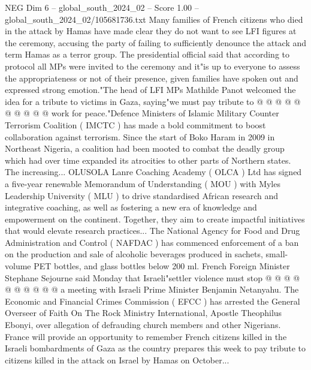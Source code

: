 \begin{textsample}{NEG Dim 6 – global\_south\_2024\_02 – Score 1.00 – global\_south\_2024\_02/105681736.txt}
Many families of French citizens who died in the attack by Hamas have made clear they do not want to see LFI figures at the ceremony, accusing the party of failing to sufficiently denounce the attack and term Hamas as a terror group.
The presidential official said that according to protocol all MPs were invited to the ceremony and it"is up to everyone to assess the appropriateness or not of their presence, given families have spoken out and expressed strong emotion."The head of LFI MPs Mathilde Panot welcomed the idea for a tribute to victims in Gaza, saying"we must pay tribute to @ @ @ @ @ @ @ @ @ @ work for peace."Defence Ministers of Islamic Military Counter Terrorism Coalition ( IMCTC ) has made a bold commitment to boost collaboration against terrorism.
Since the start of Boko Haram in 2009 in Northeast Nigeria, a coalition had been mooted to combat the deadly group which had over time expanded its atrocities to other parts of Northern states.
The increasing...
OLUSOLA Lanre Coaching Academy ( OLCA ) Ltd has signed a five-year renewable Memorandum of Understanding ( MOU ) with Myles Leadership University ( MLU ) to drive standardised African research and integrative coaching, as well as fostering a new era of knowledge and empowerment on the continent.
Together, they aim to create impactful initiatives that would elevate research practices...
The National Agency for Food and Drug Administration and Control ( NAFDAC ) has commenced enforcement of a ban on the production and sale of alcoholic beverages produced in sachets, small-volume PET bottles, and glass bottles below 200 ml.
French Foreign Minister Stephane Sejourne said Monday that Israeli"settler violence must stop @ @ @ @ @ @ @ @ @ @ a meeting with Israeli Prime Minister Benjamin Netanyahu.
The Economic and Financial Crimes Commission ( EFCC ) has arrested the General Overseer of Faith On The Rock Ministry International, Apostle Theophilus Ebonyi, over allegation of defrauding church members and other Nigerians.
France will provide an opportunity to remember French citizens killed in the Israeli bombardments of Gaza as the country prepares this week to pay tribute to citizens killed in the attack on Israel by Hamas on October...

\end{textsample}
